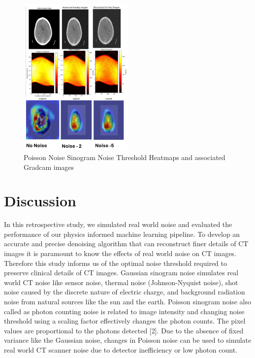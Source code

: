 \documentclass{article}
\begin{document}
\begin{figure}[h]
  \centering
  \includegraphics[width=0.5\textwidth]{sinogram_gradcam.png}
  \caption{Poisson Noise Sinogram Noise Threshold Heatmaps and associated Gradcam images}
\end{figure}

\section{Discussion }
\begin{par}
    In this retrospective study, we simulated real world  noise and evaluated the performance of our physics informed machine learning pipeline.
    To develop an accurate and precise denoising algorithm that can reconstruct finer details of CT images it is paramount to know the effects of real world noise on CT images. Therefore this study informs us of the optimal noise threshold required to preserve clinical details of CT images. Gaussian sinogram noise simulates real world CT noise like sensor noise, thermal noise (Johnson-Nyquist noise), shot noise caused by the discrete nature of electric charge, and background radiation noise from natural sources like the sun and the earth. Poisson sinogram noise also called as photon counting noise is related to image intensity and changing noise threshold using a scaling factor effectively changes the photon counts. The pixel values are proportional to the photons detected [2]. Due to the absence of fixed variance like the Gaussian noise, changes in Poisson noise can be used to simulate real world CT scanner noise due to detector inefficiency or low photon count.
\end{par}
\end{document}
